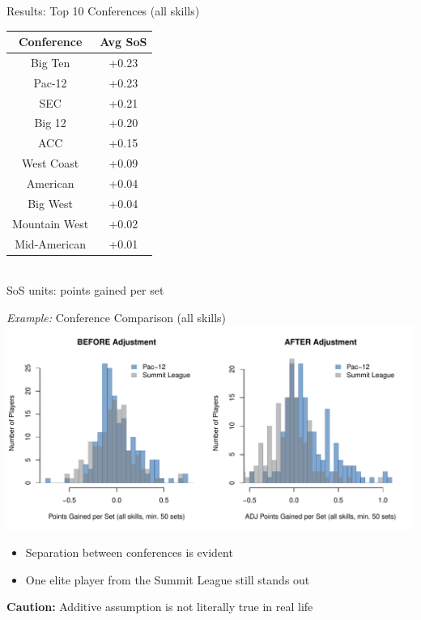 \documentclass[handout]{beamer}
\begin{document}
\begin{frame}{Results: Top 10 Conferences (all skills)}
  \centering
  \begin{tabular}{c|c}
    Conference      & Avg SoS\\
    \hline
    Big Ten         & +0.23\\
    Pac-12          & +0.23\\
    SEC             & +0.21\\
    Big 12          & +0.20\\
    ACC             & +0.15\\
    West Coast      & +0.09\\
    American        & +0.04\\
    Big West        & +0.04\\
    Mountain West   & +0.02\\
    Mid-American    & +0.01
  \end{tabular}\\
  \vspace{1cm}
  \footnotesize SoS units: points gained per set
\end{frame}

\begin{frame}{{\it Example:} Conference Comparison (all skills)}
  \includegraphics[width = \textwidth]{images/conference_comparison.pdf}
  \begin{itemize}
    \item Separation between conferences is evident
    \item One elite player from the Summit League still stands out
  \end{itemize}
  {\bf Caution:} Additive assumption is not literally true in real life
\end{frame}
\end{document}
